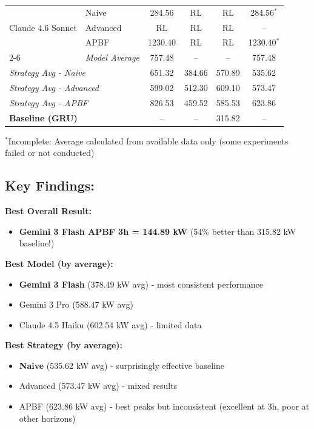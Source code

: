 \documentclass{article}
\begin{document}
\begin{table}[h!]
\begin{tabular}{llcccc}
\midrule
\multirow{3}{*}{Claude 4.6 Sonnet}
& Naive    & 284.56 & RL & RL & 284.56$^*$ \\
& Advanced & RL & RL & RL & -- \\
& APBF     & 1230.40 & RL & RL & 1230.40$^*$ \\
\cmidrule{2-6}
& \textit{Model Average} & 757.48 & -- & -- & 757.48 \\
\midrule
\midrule
\multicolumn{2}{l}{\textit{Strategy Avg - Naive}} & 651.32 & 384.66 & 570.89 & 535.62 \\
\multicolumn{2}{l}{\textit{Strategy Avg - Advanced}} & 599.02 & 512.30 & 609.10 & 573.47 \\
\multicolumn{2}{l}{\textit{Strategy Avg - APBF}} & 826.53 & 459.52 & 585.53 & 623.86 \\
\midrule
\multicolumn{2}{l}{\textbf{Baseline (GRU)}} & -- & -- & 315.82 & -- \\
\bottomrule
\end{tabular}

\vspace{0.3cm}
\footnotesize{$^*$Incomplete: Average calculated from available data only (some experiments failed or not conducted)}
\end{table}

\vspace{0.5cm}

\subsection*{Key Findings:}

\textbf{Best Overall Result:}
\begin{itemize}
\item \textbf{Gemini 3 Flash APBF 3h = 144.89 kW} (54\% better than 315.82 kW baseline!)
\end{itemize}

\textbf{Best Model (by average):}
\begin{itemize}
\item \textbf{Gemini 3 Flash} (378.49 kW avg) - most consistent performance
\item Gemini 3 Pro (588.47 kW avg)
\item Claude 4.5 Haiku (602.54 kW avg) - limited data
\end{itemize}

\textbf{Best Strategy (by average):}
\begin{itemize}
\item \textbf{Naive} (535.62 kW avg) - surprisingly effective baseline
\item Advanced (573.47 kW avg) - mixed results
\item APBF (623.86 kW avg) - best peaks but inconsistent (excellent at 3h, poor at other horizons)
\end{itemize}
\end{document}
